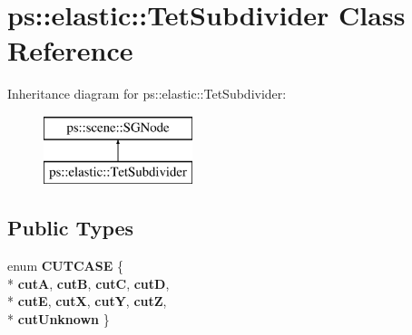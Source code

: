 \hypertarget{classps_1_1elastic_1_1TetSubdivider}{}\section{ps\+:\+:elastic\+:\+:Tet\+Subdivider Class Reference}
\label{classps_1_1elastic_1_1TetSubdivider}
Inheritance diagram for ps\+:\+:elastic\+:\+:Tet\+Subdivider\+:\begin{figure}[H]
\begin{center}
\leavevmode
\includegraphics[height=2.000000cm]{classps_1_1elastic_1_1TetSubdivider}
\end{center}
\end{figure}
\subsection*{Public Types}
\begin{DoxyCompactItemize}
\item 
\hypertarget{classps_1_1elastic_1_1TetSubdivider_a237979de41e5e60582f653399d1cb477}{}enum {\bfseries C\+U\+T\+C\+A\+S\+E} \{ \\*
{\bfseries cut\+A}, 
{\bfseries cut\+B}, 
{\bfseries cut\+C}, 
{\bfseries cut\+D}, 
\\*
{\bfseries cut\+E}, 
{\bfseries cut\+X}, 
{\bfseries cut\+Y}, 
{\bfseries cut\+Z}, 
\\*
{\bfseries cut\+Unknown}
 \}\label{classps_1_1elastic_1_1TetSubdivider_a237979de41e5e60582f653399d1cb477}

\end{DoxyCompactItemize}
